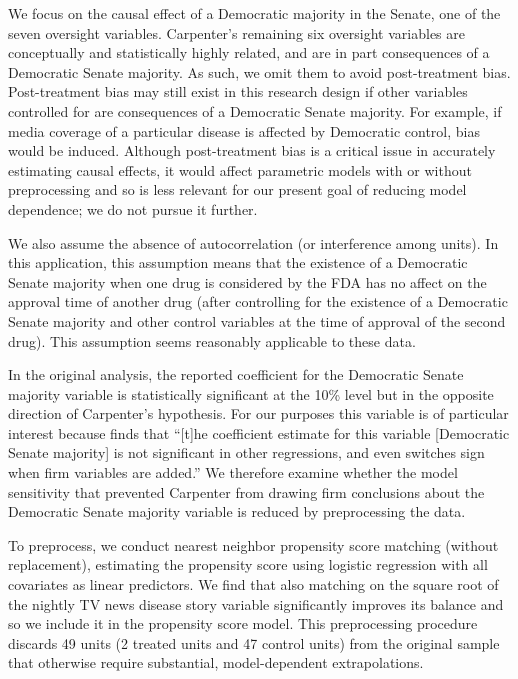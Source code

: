 \documentclass[11pt,titlepage]{article}
\begin{document}
We focus on the causal effect of a Democratic majority in the Senate,
one of the seven oversight variables.  Carpenter's remaining six
oversight variables are conceptually and statistically highly related,
and are in part consequences of a Democratic Senate majority.  As
such, we omit them to avoid post-treatment bias.  Post-treatment bias
may still exist in this research design if other variables controlled
for are consequences of a Democratic Senate majority.  For example, if
media coverage of a particular disease is affected by Democratic
control, bias would be induced.  Although post-treatment bias is a
critical issue in accurately estimating causal effects, it would
affect parametric models with or without preprocessing and so is less
relevant for our present goal of reducing model dependence;
we do not pursue it further.

We also assume the absence of autocorrelation (or interference among
units).  In this application, this assumption means that the existence
of a Democratic Senate majority when one drug is considered by the FDA
has no affect on the approval time of another drug (after
controlling for the existence of a Democratic Senate majority and
other control variables at the time of approval of the second drug).
This assumption seems reasonably applicable to these data.

In the original analysis, the reported coefficient for the Democratic
Senate majority variable is statistically significant at the 10\%
level but in the opposite direction of Carpenter's hypothesis.  For
our purposes this variable is of particular interest because
\citet[p.498]{Carp02} finds that ``[t]he coefficient estimate for this
variable [Democratic Senate majority] is not significant in other
regressions, and even switches sign when firm variables are added.''
We therefore examine whether the model sensitivity that prevented
Carpenter from drawing firm conclusions about the Democratic Senate
majority variable is reduced by preprocessing the data.

To preprocess, we conduct nearest neighbor propensity score matching
(without replacement), estimating the propensity score using logistic
regression with all covariates as linear predictors. We find that also
matching on the square root of the nightly TV news disease story
variable significantly improves its balance and so we include it in the propensity score model.
This preprocessing procedure discards 49 units (2 treated units and 47
control units) from the original sample that otherwise require
substantial, model-dependent extrapolations.
\end{document}
